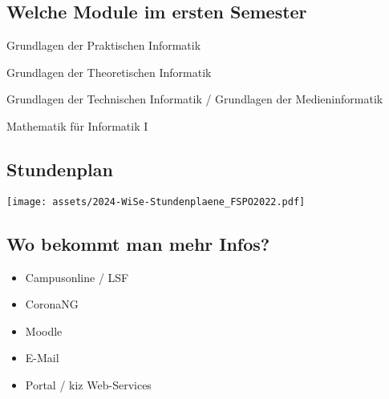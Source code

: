 \documentclass[
	aspectratio=169, 
	10pt 
]{beamer}
\begin{document}
\subsection{Welche Module im ersten Semester}

\begin{frame}{\insertsubsection}
    \begin{fancycolumns}
        \begin{gdpi}{} Grundlagen der Praktischen Informatik\newline\end{gdpi}
        \begin{gdti}{} Grundlagen der Theoretischen Informatik\newline\end{gdti}

        \nextcolumn
        \begin{gdtech}{} Grundlagen der Technischen Informatik / \newline Grundlagen der Medieninformatik\end{gdtech}
        \begin{mathb}{} Mathematik für Informatik I\newline\end{mathb}
    \end{fancycolumns}
\end{frame}

\subsection{Stundenplan}
\begin{frame}{\insertsubsection}
    \begin{fancycolumns}[widths={30}]
        \nextcolumn
        \texttt{[image: assets/2024-WiSe-Stundenplaene\_FSPO2022.pdf]}
    \end{fancycolumns} 
\end{frame}


\subsection{Wo bekommt man mehr Infos?}
\begin{frame}{\insertsubsection}
    \begin{itemize}
        \item Campusonline / LSF
        \item CoronaNG
        \item Moodle
        \item E-Mail
        \item Portal / kiz Web-Services
    \end{itemize}
\end{frame}
\end{document}
